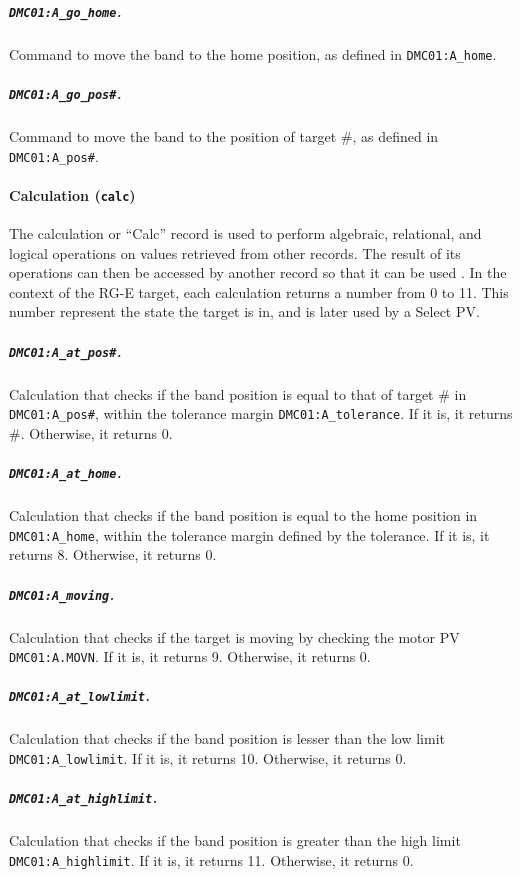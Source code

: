     \subparagraph{\texttt{DMC01:A\_go\_home}.}
        Command to move the band to the home position, as defined in \texttt{DMC01:A\_home}.

    \subparagraph{\texttt{DMC01:A\_go\_pos\#}.}
        Command to move the band to the position of target \#, as defined in \texttt{DMC01:A\_pos\#}.

\paragraph{Calculation (\texttt{calc})}
\label{par::calculation}
    The calculation or ``Calc'' record is used to perform algebraic, relational, and logical operations on values retrieved from other records.
    The result of its operations can then be accessed by another record so that it can be used \cite{stanley1998}.
    In the context of the RG-E target, each calculation returns a number from 0 to 11.
    This number represent the state the target is in, and is later used by a Select PV.

    \subparagraph{\texttt{DMC01:A\_at\_pos\#}.}
        Calculation that checks if the band position is equal to that of target \# in \texttt{DMC01:A\_pos\#}, within the tolerance margin \texttt{DMC01:A\_tolerance}.
        If it is, it returns \#.
        Otherwise, it returns 0.

    \subparagraph{\texttt{DMC01:A\_at\_home}.}
        Calculation that checks if the band position is equal to the home position in \texttt{DMC01:A\_home}, within the tolerance margin defined by the tolerance.
        If it is, it returns 8.
        Otherwise, it returns 0.

    \subparagraph{\texttt{DMC01:A\_moving}.}
        Calculation that checks if the target is moving by checking the motor PV \texttt{DMC01:A.MOVN}.
        If it is, it returns 9.
        Otherwise, it returns 0.

    \subparagraph{\texttt{DMC01:A\_at\_lowlimit}.}
        Calculation that checks if the band position is lesser than the low limit \texttt{DMC01:A\_lowlimit}.
        If it is, it returns 10.
        Otherwise, it returns 0.

    \subparagraph{\texttt{DMC01:A\_at\_highlimit}.}
        Calculation that checks if the band position is greater than the high limit \texttt{DMC01:A\_highlimit}.
        If it is, it returns 11.
        Otherwise, it returns 0.

